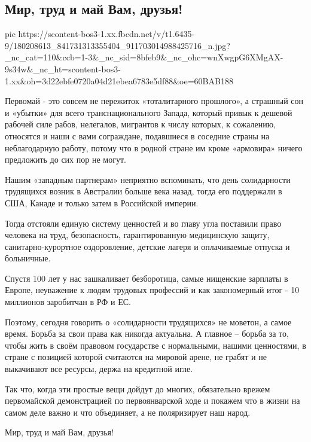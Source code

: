  
 
 
 
 
\subsection{Мир, труд и май Вам, друзья!}

\ifcmt
  pic https://scontent-bos3-1.xx.fbcdn.net/v/t1.6435-9/180208613_841731313355404_911703014988425716_n.jpg?_nc_cat=110&ccb=1-3&_nc_sid=8bfeb9&_nc_ohc=wnXwgpG6XMgAX-9s34w&_nc_ht=scontent-bos3-1.xx&oh=3d22ebfe0720a04d21ebea6783e5df88&oe=60BAB188
\fi

Первомай - это совсем не пережиток «тоталитарного прошлого», а страшный сон и
«убытки» для всего транснационального Запада, который привык к дешевой рабочей
силе рабов, нелегалов, мигрантов к числу которых, к сожалению, относятся и наши
с вами сограждане, подавшиеся в соседние страны на неблагодарную работу, потому
что в родной стране им кроме «армовира» ничего предложить до сих пор не могут.

Нашим «западным партнерам» неприятно вспоминать, что день солидарности
трудящихся возник в Австралии больше века назад, тогда его поддержали в США,
Канаде и только затем в Российской империи. 

Тогда отстояли единую систему ценностей и во главу угла поставили право
человека на труд, безопасность, гарантированную медицинскую защиту,
санитарно-курортное оздоровление, детские лагеря и оплачиваемые отпуска и
больничные.

Спустя 100 лет  у нас зашкаливает безборотица, самые нищенские зарплаты в
Европе, неуважение к людям трудовых профессий и как закономерный итог - 10
миллионов заробитчан в РФ и ЕС.

Поэтому, сегодня говорить о «солидарности трудящихся» не моветон, а самое
время. Борьба за свои права как никогда актуальна. А главное – борьба за то,
чтобы жить в своём правовом государстве с нормальными, нашими ценностями, в
стране с позицией которой считаются на мировой арене, не грабят и не выкачивают
все ресурсы, держа на кредитной игле.

Так что, когда эти простые вещи дойдут до многих, обязательно врежем
первомайской демонстрацией по первоянварской ходе и покажем что в жизни на
самом деле важно и что объединяет, а не поляризирует наш народ. 

Мир, труд и май Вам, друзья!
